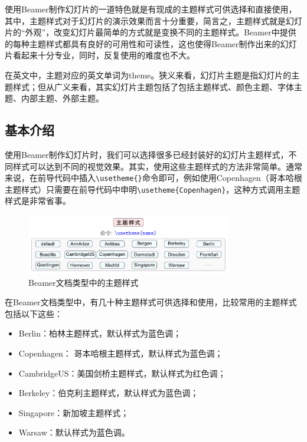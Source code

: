 使用Beamer制作幻灯片的一道特色就是有现成的主题样式可供选择和直接使用，其中，主题样式对于幻灯片的演示效果而言十分重要，简言之，主题样式就是幻灯片的“外观”，改变幻灯片最简单的方式就是变换不同的主题样式。Beamer中提供的每种主题样式都具有良好的可用性和可读性，这也使得Beamer制作出来的幻灯片看起来十分专业，同时，反复使用的难度也不大。

在英文中，主题对应的英文单词为theme。狭义来看，幻灯片主题是指幻灯片的主题样式；但从广义来看，其实幻灯片主题包括了包括主题样式、颜色主题、字体主题、内部主题、外部主题。

\subsection{基本介绍}

使用Beamer制作幻灯片时，我们可以选择很多已经封装好的幻灯片主题样式，不同样式可以达到不同的视觉效果。其实，使用这些主题样式的方法非常简单。通常来说，在前导代码中插入\texttt{\textbackslash{}usetheme\{\}}命令即可，例如使用Copenhagen（哥本哈根主题样式）只需要在前导代码中申明\texttt{\textbackslash{}usetheme\{Copenhagen\}}，这种方式调用主题样式是非常省事。

\begin{figure}[htbp]
    \centering
    \includegraphics[width = 0.8\textwidth]{images/ch_9/beamer_theme.pdf}
    \caption{Beamer文档类型中的主题样式}
    \label{figeg:001}
\end{figure}

在Beamer文档类型中，有几十种主题样式可供选择和使用，比较常用的主题样式包括以下这些：
\begin{itemize}
    \item Berlin：柏林主题样式，默认样式为蓝色调；
    \item Copenhagen： 哥本哈根主题样式，默认样式为蓝色调；
    \item CambridgeUS：美国剑桥主题样式，默认样式为红色调；
    \item Berkeley：伯克利主题样式，默认样式为蓝色调；
    \item Singapore：新加坡主题样式；
    \item Warsaw：默认样式为蓝色调。
\end{itemize}

